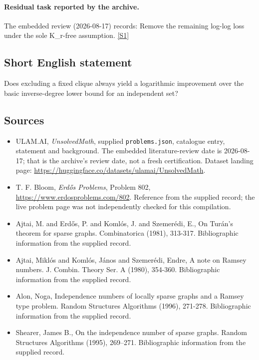 \documentclass[11pt,a4paper]{article}
\newcommand{\sref}[2]{\hyperlink{source:#1:#2}{[S#2]}}
\begin{document}
\paragraph{Residual task reported by the archive.}

The embedded review (2026-08-17) records: Remove the remaining log-log loss under the sole K\_r-free assumption. \sref{statement}{1}

\subsection{Short English statement}

Does excluding a fixed clique always yield a logarithmic improvement over the basic inverse-degree lower bound for an independent set?

\subsection{Sources}

{\small

\begin{itemize}

\item[\hypertarget{source:statement:1}{S1}] ULAM.AI, \emph{UnsolvedMath}, supplied \texttt{problems.json}, catalogue entry, statement and background. The embedded literature-review date is 2026-08-17; that is the archive’s review date, not a fresh certification. Dataset landing page: \url{https://huggingface.co/datasets/ulamai/UnsolvedMath}.

\item[\hypertarget{source:statement:2}{S2}] T. F. Bloom, \emph{Erdős Problems}, Problem 802, \url{https://www.erdosproblems.com/802}. Reference from the supplied record; the live problem page was not independently checked for this compilation.

\item[\hypertarget{source:statement:3}{S3}] Ajtai, M. and Erd\H{o}s, P. and Koml\'{o}s, J. and Szemer\'{e}di, E., On Tur\'{a}n's theorem for sparse graphs. Combinatorica (1981), 313-317. Bibliographic information from the supplied record.

\item[\hypertarget{source:statement:4}{S4}] Ajtai, Mikl\'{o}s and Koml\'{o}s, J\'{a}nos and Szemer\'{e}di, Endre, A note on Ramsey numbers. J. Combin. Theory Ser. A (1980), 354-360. Bibliographic information from the supplied record.

\item[\hypertarget{source:statement:5}{S5}] Alon, Noga, Independence numbers of locally sparse graphs and a Ramsey type problem. Random Structures Algorithms (1996), 271-278. Bibliographic information from the supplied record.

\item[\hypertarget{source:statement:6}{S6}] Shearer, James B., On the independence number of sparse graphs. Random Structures Algorithms (1995), 269--271. Bibliographic information from the supplied record.

\end{itemize}

}

\label{end:statement}
\end{document}
